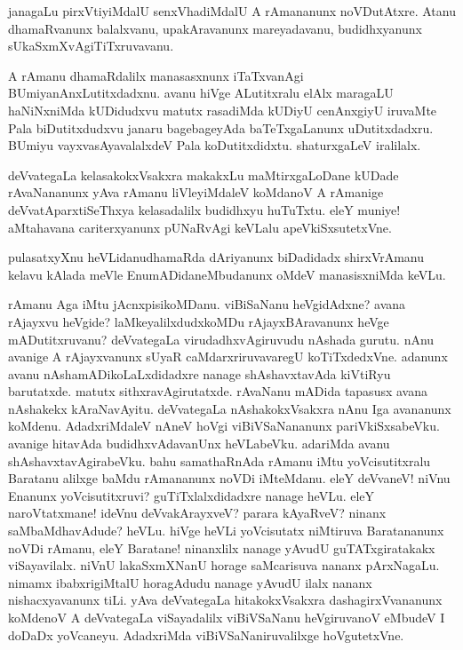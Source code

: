 \begin{mng}
janagaLu pirxVtiyiMdalU senxVhadiMdalU A rAmananunx noVDutAtxre. Atanu dhamaRvanunx balalxvanu, upakAravanunx mareyadavanu, budidhxyanunx sUkaSxmXvAgiTiTxruvavanu.
\end{mng}

\begin{mng}
A rAmanu dhamaRdalilx manasasxnunx iTaTxvanAgi BUmiyanAnxLutitxdadxnu. avanu hiVge ALutitxralu elAlx maragaLU haNiNxniMda kUDidudxvu matutx rasadiMda kUDiyU cenAnxgiyU iruvaMte Pala biDutitxdudxvu janaru bagebageyAda baTeTxgaLanunx uDutitxdadxru. BUmiyu vayxvasAyavalalxdeV Pala koDutitxdidxtu. shaturxgaLeV iralilalx.
\end{mng}

\begin{mng}
deVvategaLa kelasakokxVsakxra makakxLu maMtirxgaLoDane kUDade rAvaNananunx yAva rAmanu liVleyiMdaleV koMdanoV A rAmanige deVvatAparxtiSeThxya kelasadalilx budidhxyu huTuTxtu. eleY muniye! aMtahavana cariterxyanunx pUNaRvAgi keVLalu apeVkiSxsutetxVne.
\end{mng}

\begin{mng}
pulasatxyXnu heVLidanu\mdash dhamaRda dAriyanunx biDadidadx shirxVrAmanu kelavu kAlada meVle EnumADidaneMbudanunx oMdeV manasisxniMda keVLu.
\end{mng}

\begin{mng}
rAmanu Aga iMtu jAcnxpisikoMDanu. viBiSaNanu heVgidAdxne? avana rAjayxvu heVgide? laMkeyalilxdudxkoMDu rAjayxBAravanunx heVge mADutitxruvanu? deVvategaLa virudadhxvAgiruvudu nAshada gurutu. nAnu avanige A rAjayxvanunx sUyaR caMdarxriruvavaregU koTiTxdedxVne. adanunx avanu nAshamADikoLaLxdidadxre nanage shAshavxtavAda kiVtiRyu barutatxde. matutx sithxravAgirutatxde. rAvaNanu mADida tapasusx avana nAshakekx kAraNavAyitu. deVvategaLa nAshakokxVsakxra nAnu Iga avananunx koMdenu. AdadxriMdaleV nAneV hoVgi viBiVSaNananunx pariVkiSxsabeVku. avanige hitavAda budidhxvAdavanUnx heVLabeVku. adariMda avanu shAshavxtavAgirabeVku. bahu samathaRnAda rAmanu iMtu yoVcisutitxralu Baratanu alilxge baMdu rAmananunx noVDi iMteMdanu. eleY deVvaneV! niVnu Enanunx yoVcisutitxruvi? guTiTxlalxdidadxre nanage heVLu. eleY naroVtatxmane! ideVnu deVvakArayxveV? parara kAyaRveV? ninanx saMbaMdhavAdude? heVLu. hiVge heVLi yoVcisutatx niMtiruva Baratananunx noVDi rAmanu, eleY Baratane! ninanxlilx nanage yAvudU guTATxgiratakakx viSayavilalx. niVnU lakaSxmXNanU horage saMcarisuva nananx pArxNagaLu. nimamx ibabxrigiMtalU horagAdudu nanage yAvudU ilalx nananx nishacxyavanunx tiLi. yAva deVvategaLa hitakokxVsakxra dashagirxVvananunx koMdenoV A deVvategaLa viSayadalilx viBiVSaNanu heVgiruvanoV eMbudeV I doDaDx yoVcaneyu. AdadxriMda viBiVSaNaniruvalilxge hoVgutetxVne.
\end{mng}

